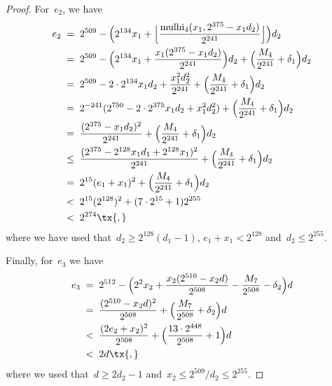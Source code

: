\documentclass[12pt,oneside,draft]{scrartcl}
\begin{document}
\begin{proof}
For~$e_{2}$, we have
\begin{align*}
  e_{2}
\;={}&\;
  2^{509} - \Bigl( 2^{134} x_{1} + \Bigl\lfloor \frac{\mulhi_{4}(x_{1}, 2^{375} - x_{1} d_{2})}{2^{241}} \Bigr\rfloor \Bigr) d_{2}
\\
={}&\;
  2^{509} - \Bigl( 2^{134} x_{1} + \frac{x_{1} (2^{375} - x_{1} d_{2})}{2^{241}} \Bigr) d_{2} + \Bigl( \frac{M_{4}}{2^{241}} + \delta_{1} \Bigr) d_{2}
\\
={}&\;
  2^{509} - 2 \cdot 2^{134} x_{1} d_{2} + \frac{x_{1}^{2} d_{2}^{2}}{2^{241}} + \Bigl( \frac{M_{4}}{2^{241}} + \delta_{1} \Bigr) d_{2}
\\
={}&\;
  2^{-241} (2^{750} - 2 \cdot 2^{375} x_{1} d_{2} + x_{1}^{2} d_{2}^{2}) + \Bigl( \frac{M_{4}}{2^{241}} + \delta_{1} \Bigr) d_{2}
\\
={}&\;
  \frac{(2^{375} - x_{1} d_{2})^{2}}{2^{241}} + \Bigl( \frac{M_{4}}{2^{241}} + \delta_{1} \Bigr) d_{2}
\\
\le{}&\;
  \frac{(2^{375} - 2^{128} x_{1} d_{1} + 2^{128} x_{1})^{2}}{2^{241}} + \Bigl( \frac{M_{4}}{2^{241}} + \delta_{1} \Bigr) d_{2}
\\
={}&\;
  2^{15} (e_{1} + x_{1})^{2} + \Bigl( \frac{M_{4}}{2^{241}} + \delta_{1} \Bigr) d_{2}
\\
<{}&\;
  2^{15} (2^{128})^{2} + (7 \cdot 2^{15} + 1) 2^{255}
\\
<{}&\;
  2^{274}
\tx{,}
\end{align*}
where we have used that~$d_{2} \ge 2^{128} (d_{1} - 1)$, $e_{1} + x_{1} < 2^{128}$ and~$d_{2} \le 2^{255}$.

Finally, for~$e_{3}$ we have
\begin{align*}
  e_{3}
\;={}&\;
  2^{512} - \Bigl( 2^{2} x_{2} + \frac{x_{2} (2^{510} - x_{2} d)}{2^{508}} - \frac{M_{7}}{2^{508}} - \delta_{2} \Bigr) d
\\
={}&\;
  \frac{(2^{510} - x_{2} d)^{2}}{2^{508}} + \Bigl( \frac{M_{7}}{2^{508}} + \delta_{2} \Bigr) d
\\
<{}&\;
  \frac{(2 e_{2} + x_{2})^{2}}{2^{508}} + \Bigl( \frac{13 \cdot 2^{448}}{2^{508}} + 1 \Bigr) d
\\
<{}&\;
  2 d
\tx{,}
\end{align*}
where we used that~$d \ge 2 d_{2} - 1$ and~$x_{2} \le 2^{509} / d_{2} \le 2^{255}$.
\end{proof}
\end{document}
